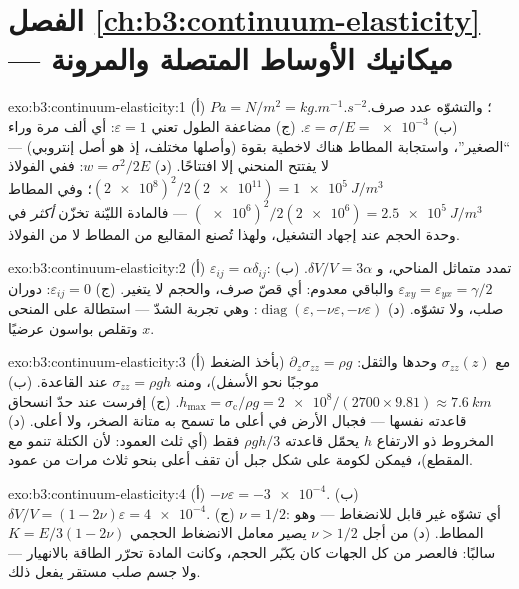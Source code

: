 \section*{الفصل \ref{ch:b3:continuum-elasticity} --- ميكانيك الأوساط المتصلة والمرونة}

\begin{solution}{exo:b3:continuum-elasticity:1}
(أ) $\unit{Pa} = \unit{N/m^2} = \unit{kg.m^{-1}.s^{-2}}$؛ والتشوّه
عدد صرف. (ب) $\varepsilon = \sigma/E = \num{e-3}$. (ج) مضاعفة
الطول تعني $\varepsilon = 1$: أي ألف مرة وراء ``الصغير''،
واستجابة المطاط هناك لاخطية بقوة (وأصلها مختلف، إذ هو أصل
إنتروبي) ---  لا يفتتح المنحني إلا افتتاحًا. (د) $w =
\sigma^2/2E$: ففي الفولاذ $(\num{2e8})^2/2(\num{2e11}) =
\qty{1e5}{J/m^3}$؛ وفي المطاط $(\num{e6})^2/2(\num{2e6}) =
\qty{2.5e5}{J/m^3}$ --- فالمادة الليّنة تخزّن \emph{أكثر} في وحدة
الحجم عند إجهاد التشغيل، ولهذا تُصنع المقاليع من المطاط لا من
الفولاذ.
\end{solution}

\begin{solution}{exo:b3:continuum-elasticity:2}
(أ) $\varepsilon_{ij} = \alpha\delta_{ij}$: تمدد متماثل المناحي،
و $\delta V/V = 3\alpha$. (ب) $\varepsilon_{xy} = \varepsilon_{yx} =
\gamma/2$ والباقي معدوم: أي قصّ صرف، والحجم لا يتغير. (ج)
$\varepsilon_{ij} = 0$: دوران صلب، ولا تشوّه. (د)
$\operatorname{diag}(\varepsilon, -\nu\varepsilon, -\nu\varepsilon)$:
وهي تجربة الشدّ --- استطالة على المنحى $x$ وتقلص بواسون عرضيًا.
\end{solution}

\begin{solution}{exo:b3:continuum-elasticity:3}
(أ) مع $\sigma_{zz}(z)$ وحدها والثقل: $\partial_z\sigma_{zz} =
\rho g$ (بأخذ الضغط موجبًا نحو الأسفل)، ومنه $\sigma_{zz} = \rho
gh$ عند القاعدة. (ب) $h_{\max} = \sigma_{\text{c}}/\rho g =
\num{2e8}/(2700 \times 9.81) \approx \qty{7.6}{km}$. (ج) إفرست عند
حدّ انسحاق قاعدته نفسها --- فجبال الأرض في أعلى ما تسمح به متانة
الصخر، ولا أعلى. (د) المخروط ذو الارتفاع $h$ يحمّل
قاعدته $\rho gh/3$ فقط (أي ثلث العمود: لأن الكتلة تنمو
مع المقطع)، فيمكن لكومة على شكل جبل أن تقف أعلى بنحو ثلاث
مرات من عمود.
\end{solution}

\begin{solution}{exo:b3:continuum-elasticity:4}
(أ) $-\nu\varepsilon = \num{-3e-4}$. (ب) $\delta V/V = (1 -
2\nu)\varepsilon = \num{4e-4}$. (ج) $\nu = 1/2$: أي تشوّه غير
قابل للانضغاط --- وهو المطاط. (د) من أجل $\nu > 1/2$ يصير معامل
الانضغاط الحجمي $K =
E/3(1 - 2\nu)$ سالبًا: فالعصر من كل الجهات
كان \emph{يكبّر} الحجم، وكانت المادة تحرّر الطاقة بالانهيار ---
ولا جسم صلب مستقر يفعل ذلك.
\end{solution}

